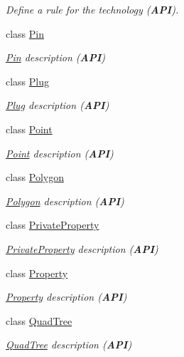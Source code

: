 \begin{DoxyCompactItemize}
\begin{DoxyCompactList}\small\item\em Define a rule for the technology ({\bfseries A\+PI}). \end{DoxyCompactList}\item 
class \mbox{\hyperlink{classHurricane_1_1Pin}{Pin}}
\begin{DoxyCompactList}\small\item\em \mbox{\hyperlink{classHurricane_1_1Pin}{Pin}} description ({\bfseries A\+PI}) \end{DoxyCompactList}\item 
class \mbox{\hyperlink{classHurricane_1_1Plug}{Plug}}
\begin{DoxyCompactList}\small\item\em \mbox{\hyperlink{classHurricane_1_1Plug}{Plug}} description ({\bfseries A\+PI}) \end{DoxyCompactList}\item 
class \mbox{\hyperlink{classHurricane_1_1Point}{Point}}
\begin{DoxyCompactList}\small\item\em \mbox{\hyperlink{classHurricane_1_1Point}{Point}} description ({\bfseries A\+PI}) \end{DoxyCompactList}\item 
class \mbox{\hyperlink{classHurricane_1_1Polygon}{Polygon}}
\begin{DoxyCompactList}\small\item\em \mbox{\hyperlink{classHurricane_1_1Polygon}{Polygon}} description ({\bfseries A\+PI}) \end{DoxyCompactList}\item 
class \mbox{\hyperlink{classHurricane_1_1PrivateProperty}{Private\+Property}}
\begin{DoxyCompactList}\small\item\em \mbox{\hyperlink{classHurricane_1_1PrivateProperty}{Private\+Property}} description ({\bfseries A\+PI}) \end{DoxyCompactList}\item 
class \mbox{\hyperlink{classHurricane_1_1Property}{Property}}
\begin{DoxyCompactList}\small\item\em \mbox{\hyperlink{classHurricane_1_1Property}{Property}} description ({\bfseries A\+PI}) \end{DoxyCompactList}\item 
class \mbox{\hyperlink{classHurricane_1_1QuadTree}{Quad\+Tree}}
\begin{DoxyCompactList}\small\item\em \mbox{\hyperlink{classHurricane_1_1QuadTree}{Quad\+Tree}} description ({\bfseries A\+PI}) \end{DoxyCompactList}\item 

\end{DoxyCompactItemize}
